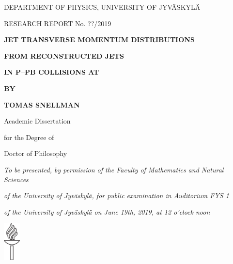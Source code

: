 



\thispagestyle{empty}
\vspace*{10mm}

\centerline{DEPARTMENT OF PHYSICS, UNIVERSITY OF JYV\"ASKYL\"A}
\centerline{RESEARCH REPORT No. ??/2019}

\vspace{25mm} 

\centerline{\bf JET TRANSVERSE MOMENTUM DISTRIBUTIONS }
\centerline{\bf  FROM RECONSTRUCTED JETS}

\centerline{\bf  IN P--PB COLLISIONS AT }
\centerline{\bf }

\vspace{13mm}


\centerline{\bf BY}
\centerline{\bf TOMAS SNELLMAN}

\vspace{13mm}

\centerline{Academic Dissertation}
\centerline{for the Degree of}
\centerline{Doctor of Philosophy}

\vspace{13mm}


\centerline{\emph{
To be presented, by permission of the Faculty of Mathematics and Natural Sciences}}
\centerline{\emph{
 of the University of Jyv\"askyl\"a, for public examination in Auditorium FYS 1}}
 \centerline{\emph{ of the University of Jyv\"askyl\"a on June 19th, 2019, at 12 o'clock noon}}

\vspace{13mm}



\centerline{\includegraphics[height=20mm]{Soihtu}}

